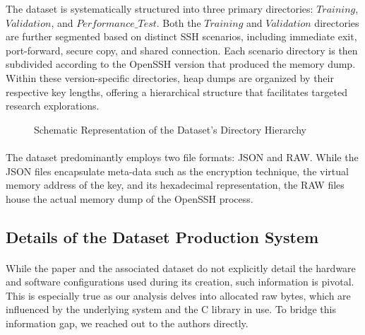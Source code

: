     \begin{minipage}{\dimexpr\linewidth-20pt}
        The dataset is systematically structured into three primary directories: $Training$, $Validation$, and $Performance\_Test$. Both the $Training$ and $Validation$ directories are further segmented based on distinct SSH scenarios, including immediate exit, port-forward, secure copy, and shared connection. Each scenario directory is then subdivided according to the OpenSSH version that produced the memory dump. Within these version-specific directories, heap dumps are organized by their respective key lengths, offering a hierarchical structure that facilitates targeted research explorations.

        \begin{figure}[H]
            \centering
            \caption{Schematic Representation of the Dataset's Directory Hierarchy}
            \label{fig:dataset_structure}
            \begin{minipage}{0.6\textwidth}
        \end{minipage}
        \end{figure}
    \end{minipage}

    \paragraph{}The dataset predominantly employs two file formats: JSON and RAW. While the JSON files encapsulate meta-data such as the encryption technique, the virtual memory address of the key, and its hexadecimal representation, the RAW files house the actual memory dump of the OpenSSH process.

    \subsection{Details of the Dataset Production System}\label{sec:background:dataset:production_system_information}
        \paragraph{}While the \cite{fellicious_smartkex_2022} paper and the associated dataset do not explicitly detail the hardware and software configurations used during its creation, such information is pivotal. This is especially true as our analysis delves into allocated raw bytes, which are influenced by the underlying system and the C library in use. To bridge this information gap, we reached out to the authors directly.

